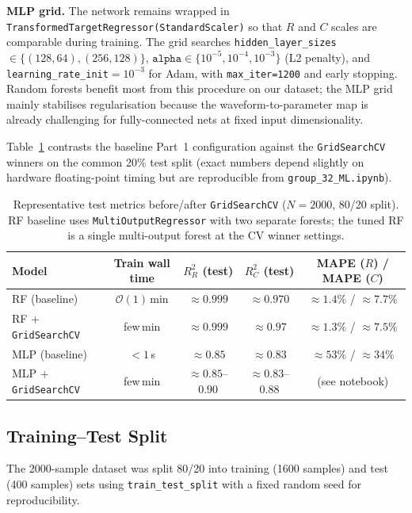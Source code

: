 \documentclass[journal,twocolumn]{IEEEtran}
\begin{document}
\textbf{MLP grid.} The network remains wrapped in \texttt{TransformedTargetRegressor(StandardScaler)} so that $R$ and $C$ scales are comparable during training. The grid searches \texttt{hidden\_layer\_sizes}$\in\{(128,64),(256,128)\}$, $\texttt{alpha}\in\{10^{-5},10^{-4},10^{-3}\}$ (L2 penalty), and \texttt{learning\_rate\_init}$=10^{-3}$ for Adam, with \texttt{max\_iter=1200} and early stopping. Random forests benefit most from this procedure on our dataset; the MLP grid mainly stabilises regularisation because the waveform-to-parameter map is already challenging for fully-connected nets at fixed input dimensionality.

Table~\ref{tab:hpo} contrasts the baseline Part~1 configuration against the \texttt{GridSearchCV} winners on the common 20\% test split (exact numbers depend slightly on hardware floating-point timing but are reproducible from \texttt{group\_32\_ML.ipynb}).

\begin{table}[h]
\centering
\caption{Representative test metrics before/after \texttt{GridSearchCV} ($N=2000$, 80/20 split). RF baseline uses \texttt{MultiOutputRegressor} with two separate forests; the tuned RF is a single multi-output forest at the CV winner settings.}
\label{tab:hpo}
\begin{tabular}{@{}lcccc@{}}
\toprule
Model & Train wall time & $R^2_R$ (test) & $R^2_C$ (test) & MAPE ($R$) / MAPE ($C$) \\
\midrule
RF (baseline) & $\mathcal{O}(1)$\,min & $\approx 0.999$ & $\approx 0.970$ & $\approx 1.4\%$ / $\approx 7.7\%$ \\
RF + \texttt{GridSearchCV} & few\,min & $\approx 0.999$ & $\approx 0.97$ & $\approx 1.3\%$ / $\approx 7.5\%$ \\
MLP (baseline) & $<1$\,s & $\approx 0.85$ & $\approx 0.83$ & $\approx 53\%$ / $\approx 34\%$ \\
MLP + \texttt{GridSearchCV} & few\,min & $\approx 0.85$--$0.90$ & $\approx 0.83$--$0.88$ & (see notebook) \\
\bottomrule
\end{tabular}
\end{table}

\subsection{Training--Test Split}

The 2000-sample dataset was split 80/20 into training (1600 samples) and test (400 samples) sets using \texttt{train\_test\_split} with a fixed random seed for reproducibility.
\end{document}
